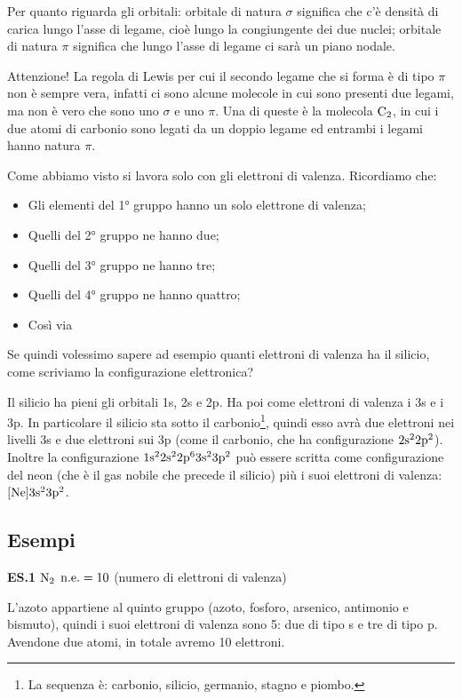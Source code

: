 Per quanto riguarda gli orbitali: orbitale di natura $\sigma$ significa che c'è densità di carica lungo l'asse di legame, cioè lungo la congiungente dei due nuclei; orbitale di natura $\pi$ significa che lungo l'asse di legame ci sarà un piano nodale.

Attenzione! La regola di Lewis per cui il secondo legame che si forma è di tipo $\pi$ non è sempre vera, infatti ci sono alcune molecole in cui sono presenti due legami, ma non è vero che sono uno $\sigma$ e uno $\pi$. Una di queste è la molecola $\rm C_2$, in cui i due atomi di carbonio sono legati da un doppio legame ed entrambi i legami hanno natura $\pi$.

Come abbiamo visto si lavora solo con gli elettroni di valenza. Ricordiamo che:
\begin{itemize}
    \item Gli elementi del 1° gruppo hanno un solo elettrone di valenza;
    \item Quelli del 2° gruppo ne hanno due;
    \item Quelli del 3° gruppo ne hanno tre;
    \item Quelli del 4° gruppo ne hanno quattro;
    \item Così via
\end{itemize}

Se quindi volessimo sapere ad esempio quanti elettroni di valenza ha il silicio, come scriviamo la configurazione elettronica?

Il silicio ha pieni gli orbitali 1s, 2s e 2p. Ha poi come elettroni di valenza i 3s e i 3p. In particolare il silicio sta sotto il carbonio\footnote{La sequenza è: carbonio, silicio, germanio, stagno e piombo.}, quindi esso avrà due elettroni nei livelli 3s e due elettroni sui 3p (come il carbonio, che ha configurazione $\rm 2s^22p^2$). Inoltre la configurazione $\rm 1s^22s^22p^63s^23p^2$ può essere scritta come configurazione del neon (che è il gas nobile che precede il silicio) più i suoi elettroni di valenza: $\rm [Ne]3s^23p^2$.

\subsection{Esempi}
\textbf{ES.1} $\rm N_2$ $\rm n.e.=10$ (numero di elettroni di valenza)

L'azoto appartiene al quinto gruppo (azoto, fosforo, arsenico, antimonio e bismuto), quindi i suoi elettroni di valenza sono 5: due di tipo s e tre di tipo p. Avendone due atomi, in totale avremo 10 elettroni.


